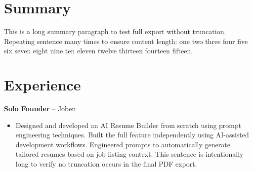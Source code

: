 ﻿\documentclass[letterpaper,11pt]{article}
\begin{document}
\section*{Summary}
This is a long summary paragraph to test full export without truncation. Repeating sentence many times to ensure content length: one two three four five six seven eight nine ten eleven twelve thirteen fourteen fifteen.

\section*{Experience}
\textbf{Solo Founder} -- Joben\\
\begin{itemize}
\item Designed and developed an AI Resume Builder from scratch using prompt engineering techniques. Built the full feature independently using AI-assisted development workflows. Engineered prompts to automatically generate tailored resumes based on job listing context. This sentence is intentionally long to verify no truncation occurs in the final PDF export.
\end{itemize}
\end{document}
